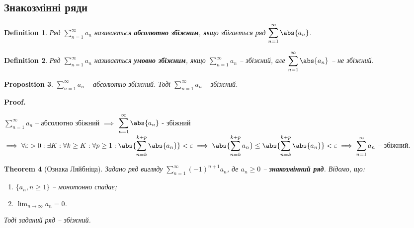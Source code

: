 \documentclass[a4paper, 10pt]{article}
\makeatletter
\def\huge{\displaystyle}
\def\qed{$\blacksquare$}
\theoremstyle{theoremdd}
\newtheorem{theorem}{Theorem}[subsection]
\theoremstyle{theoremdd}
\theoremstyle{theoremdd}
\newtheorem{definition}[theorem]{Definition}
\theoremstyle{theoremdd}
\theoremstyle{theoremdd}
\theoremstyle{theoremdd}
\newtheorem{proposition}[theorem]{Proposition}
\theoremstyle{theoremdd}
\theoremstyle{theoremdd}
\theoremstyle{theoremdd}
\renewenvironment{proof}[1][Proof.\\]{\par
\pushQED{\hfill \qed}%
\normalfont \topsep6\p@\@plus6\p@\relax
\trivlist
\item\relax
{\bfseries
#1\@addpunct{.}}\hspace\labelsep\ignorespaces
}{%
\popQED\endtrivlist\@endpefalse
}
\makeatother
\begin{document}
\subsection{Знакозмінні ряди}
\begin{definition}
Ряд $\huge \sum_{n=1}^\infty a_n$ називається \textbf{абсолютно збіжним}, якщо збігається ряд $\huge \sum_{n=1}^\infty \abs{a_n}$.
\end{definition}

\begin{definition}
Ряд $\huge \sum_{n=1}^\infty a_n$ називається \textbf{умовно збіжним}, якщо $\huge \sum_{n=1}^\infty a_n$ -- збіжний, але $\huge \sum_{n=1}^\infty \abs{a_n}$ -- не збіжний.
\end{definition}

\begin{proposition}
$\huge \sum_{n=1}^\infty a_n$ -- абсолютно збіжний. Тоді $\huge \sum_{n=1}^\infty a_n$ -- збіжний.
\end{proposition}

\begin{proof}
$\huge \sum_{n=1}^\infty a_n$ -- абсолютно збіжний $\implies$ $\huge \sum_{n=1}^\infty \abs{a_n}$ - збіжний $\implies \forall \varepsilon > 0: \exists K: \forall k \geq K: \forall p \geq 1: \\ \huge \abs{\sum_{n=k}^{k+p} \abs{a_n}} < \varepsilon \implies \abs{\sum_{n=k}^{k+p} a_n} \leq \abs{\sum_{n=k}^{k+p} \abs{a_n}} < \varepsilon \implies  \sum_{n=1}^\infty a_n$ -- збіжний.
\end{proof}

\begin{theorem}[Ознака Ляйбніца]
Задано ряд вигляду $\huge \sum_{n=1}^\infty (-1)^{n+1}a_n$, де $a_n \geq 0$ -- \textbf{знакозмінний ряд}. Відомо, що:
\begin{enumerate}[nosep,wide=0pt,label={\arabic*)}]
\item $\{a_n, n \geq 1 \}$ -- монотонно спадає;
\item $\huge \lim_{n \to \infty} a_n = 0$.
\end{enumerate}
Тоді заданий ряд -- збіжний.
\end{theorem}
\end{document}
